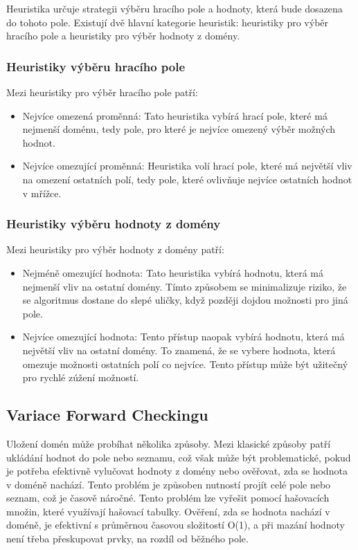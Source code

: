 Heuristika určuje strategii výběru hracího pole a hodnoty, která bude dosazena
do tohoto pole. Existují dvě hlavní kategorie heuristik: heuristiky pro výběr
hracího pole a heuristiky pro výběr hodnoty z domény.

\subsubsection{Heuristiky výběru hracího pole}

Mezi heuristiky pro výběr hracího pole patří:

\begin{itemize}
    \item Nejvíce omezená proměnná: Tato heuristika vybírá hrací pole, které má
        nejmenší doménu, tedy pole, pro které je nejvíce omezený výběr možných
        hodnot.
    \item Nejvíce omezující proměnná: Heuristika volí hrací pole, které má
        největší vliv na omezení ostatních polí, tedy pole, které ovlivňuje
        nejvíce ostatních hodnot v mřížce.
\end{itemize}

\subsubsection{Heuristiky výběru hodnoty z domény}

Mezi heuristiky pro výběr hodnoty z domény patří:

\begin{itemize}
    \item Nejméně omezující hodnota: Tato heuristika vybírá hodnotu, která má
        nejmenší vliv na ostatní domény. Tímto způsobem se minimalizuje riziko,
        že se algoritmus dostane do slepé uličky, když později dojdou možnosti
        pro jiná pole.
    \item Nejvíce omezující hodnota: Tento přístup naopak vybírá hodnotu, která
        má největší vliv na ostatní domény. To znamená, že se vybere hodnota,
        která omezuje možnosti ostatních polí co nejvíce. Tento přístup může
        být užitečný pro rychlé zúžení možností.
\end{itemize}

\subsection{Variace Forward Checkingu}

Uložení domén může probíhat několika způsoby. Mezi klasické způsoby patří
ukládání hodnot do pole nebo seznamu, což však může být problematické, pokud
je potřeba efektivně vylučovat hodnoty z domény nebo ověřovat, zda se hodnota
v doméně nachází. Tento problém je způsoben nutností projít celé pole nebo
seznam, což je časově náročné. Tento problém lze vyřešit pomocí hašovacích
množin, které využívají hašovací tabulky. Ověření, zda se hodnota nachází v
doméně, je efektivní s průměrnou časovou složitostí O(1), a při mazání hodnoty
není třeba přeskupovat prvky, na rozdíl od běžného pole.

